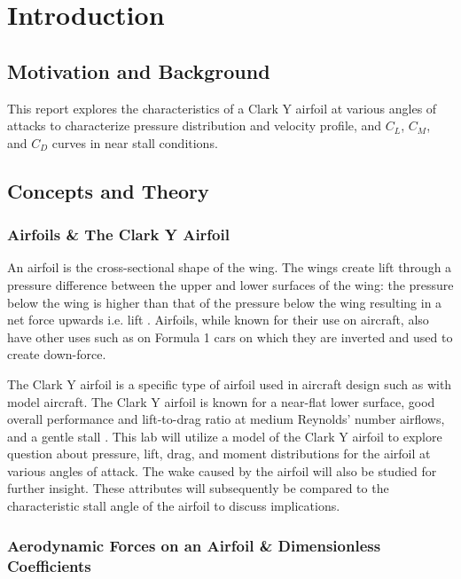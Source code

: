 \documentclass[11pt, letterpaper]{article}
\begin{document}
\section{Introduction}

\subsection{Motivation and Background}

This report explores the characteristics of a Clark Y airfoil at various angles of attacks to characterize pressure distribution and velocity profile, and $C_L$, $C_M$, and $C_D$ curves in near stall conditions. 

\subsection{Concepts and Theory}

\subsubsection{Airfoils \& The Clark Y Airfoil}

An airfoil is the cross-sectional shape of the wing. The wings create lift through a pressure difference between the upper and lower surfaces of the wing: the pressure below the wing is higher than that of the pressure below the wing resulting in a net force upwards i.e. lift \cite{airfoil}. Airfoils, while known for their use on aircraft, also have other uses such as on Formula 1 cars on which they are inverted and used to create down-force. 

The Clark Y airfoil is a specific type of airfoil used in aircraft design such as with model aircraft. The Clark Y airfoil is known for a near-flat lower surface, good overall performance and lift-to-drag ratio at medium Reynolds' number airflows, and a gentle stall \cite{clarky}. This lab will utilize a model of the Clark Y airfoil to explore question about pressure, lift, drag, and moment distributions for the airfoil at various angles of attack. The wake caused by the airfoil will also be studied for further insight. These attributes will subsequently be compared to the characteristic stall angle of the airfoil to discuss implications. 



\subsubsection{Aerodynamic Forces on an Airfoil \& Dimensionless Coefficients}
\end{document}
